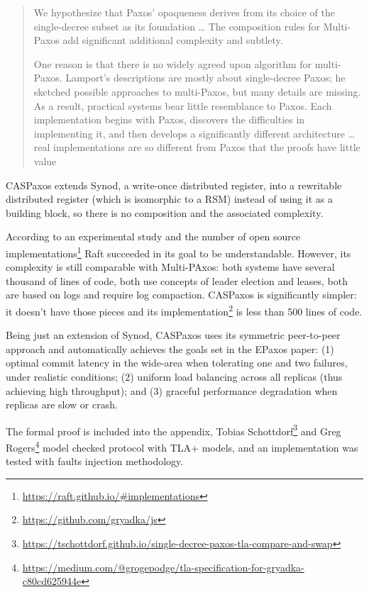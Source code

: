 \documentclass[12pt]{article}
\theoremstyle{definition}
\begin{document}
\begin{quote}
We hypothesize that Paxos’ opaqueness derives from its choice of the single-decree subset as its foundation \ldots{} The composition rules for Multi-Paxos add significant additional complexity and subtlety.

One reason is that there is no widely agreed upon algorithm for multi-Paxos. Lamport’s descriptions are mostly about single-decree Paxos; he sketched possible approaches to multi-Paxos, but many details are missing. As a result, practical systems bear little resemblance to Paxos. Each implementation begins with Paxos, discovers the difficulties in implementing it, and then develops a significantly different architecture \ldots{} real implementations are so different from Paxos that the proofs have little value
\end{quote}

CASPaxos extends Synod, a write-once distributed register, into a rewritable distributed register (which is isomorphic to a RSM) instead of using it as a building block, so there is no composition and the associated complexity.

According to an experimental study\cite{raft} and the number of open source implementations\footnote{\href{https://raft.github.io/\#implementations}{https://raft.github.io/\#implementations}} Raft succeeded in its goal to be understandable. However, its complexity is still comparable with Multi-PAxos: both systems\cite{chubby}\cite{raft} have several thousand of lines of code, both use concepts of leader election and leases, both are based on logs and require log compaction. CASPaxos is significantly simpler: it doesn't have those pieces and its implementation\footnote{\href{https://github.com/gryadka/js}{https://github.com/gryadka/js}} is less than 500 lines of code.

Being just an extension of Synod, CASPaxos uses its symmetric peer-to-peer approach and automatically achieves the goals set in the EPaxos\cite{epaxos} paper: (1) optimal commit latency in the wide-area when tolerating one and two failures, under realistic conditions; (2) uniform load balancing across all replicas (thus achieving high throughput); and (3) graceful performance degradation when replicas are slow or crash.

The formal proof is included into the appendix, Tobias Schottdorf\footnote{\href{https://tschottdorf.github.io/single-decree-paxos-tla-compare-and-swap}{https://tschottdorf.github.io/single-decree-paxos-tla-compare-and-swap}} and Greg Rogers\footnote{\href{https://medium.com/@grogepodge/tla-specification-for-gryadka-c80cd625944e}{https://medium.com/@grogepodge/tla-specification-for-gryadka-c80cd625944e}} model checked protocol with TLA+ models, and an implementation was tested with faults injection methodology.
\end{document}
